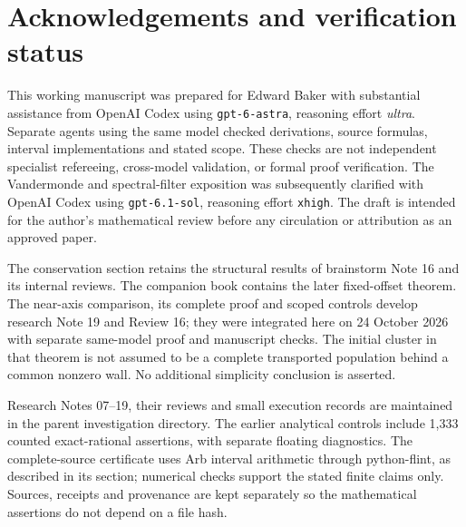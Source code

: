 \documentclass[11pt]{article}
\theoremstyle{remark}
\begin{document}








\section*{Acknowledgements and verification status}
This working manuscript was prepared for Edward Baker with substantial
assistance from OpenAI Codex using \texttt{gpt-6-astra}, reasoning effort
\emph{ultra}. Separate agents using the same model checked derivations,
source formulas, interval implementations and stated scope. These checks
are not independent specialist refereeing, cross-model validation, or
formal proof verification. The Vandermonde and spectral-filter exposition
was subsequently clarified with OpenAI Codex using \texttt{gpt-6.1-sol},
reasoning effort \texttt{xhigh}. The draft is intended for the author's
mathematical review before any circulation or attribution as an approved
paper.

The conservation section retains the structural results of brainstorm
Note 16 and its internal reviews. The companion book contains the later
fixed-offset theorem. The near-axis comparison, its complete proof and
scoped controls develop research Note 19 and Review 16; they were
integrated here on 24 October 2026 with separate same-model proof and
manuscript checks. The initial cluster in that theorem is not assumed to
be a complete transported population behind a common nonzero wall.
No additional simplicity conclusion is asserted.

Research Notes 07--19, their reviews and small execution records are
maintained in the parent investigation directory. The earlier analytical
controls include 1,333 counted exact-rational assertions, with separate
floating diagnostics. The complete-source certificate uses Arb interval
arithmetic through python-flint, as described in its section; numerical
checks support the stated finite claims only. Sources, receipts and
provenance are kept separately so the mathematical assertions do not
depend on a file hash.
\end{document}
